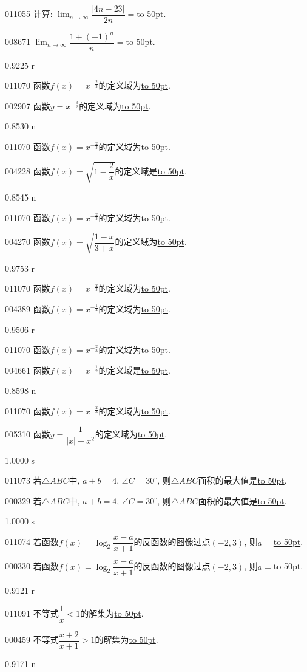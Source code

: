 \documentclass[10pt,a4paper]{article}
\newcommand{\blank}[1]{\underline{\hbox to #1pt{}}}
\begin{document}
011055	计算: $\displaystyle\lim_{n\to \infty} \dfrac{|4n-23|}{2n}=$\blank{50}.

008671	$\displaystyle\lim_{n\to\infty}\dfrac{1+(-1)^n}n=$\blank{50}.

0.9225 r

011070	函数$f(x)=x^{- \frac 23}$的定义域为\blank{50}.

002907	函数$y=x^{-\frac 32}$的定义域为\blank{50}.

0.8530 n

011070	函数$f(x)=x^{- \frac 23}$的定义域为\blank{50}.

004228	函数$f(x)=\sqrt{1-\dfrac 2x}$的定义域是\blank{50}.

0.8545 n

011070	函数$f(x)=x^{- \frac 23}$的定义域为\blank{50}.

004270	函数$f(x)=\sqrt{\dfrac{1-x}{3+x}}$的定义域为\blank{50}.

0.9753 r

011070	函数$f(x)=x^{- \frac 23}$的定义域为\blank{50}.

004389	函数$f(x)=x^{- \frac 12}$的定义域为\blank{50}.

0.9506 r

011070	函数$f(x)=x^{- \frac 23}$的定义域为\blank{50}.

004661	函数$f(x)={x^{-\frac 12}}$的定义域是\blank{50}.

0.8598 n

011070	函数$f(x)=x^{- \frac 23}$的定义域为\blank{50}.

005310	函数$y=\dfrac 1{|x|-x^2}$的定义域为\blank{50}.

1.0000 s

011073	若$\triangle ABC$中, $a+b=4$, $\angle C=30^\circ$, 则$\triangle  ABC$面积的最大值是\blank{50}.

000329	若$\triangle ABC$中, $a+b=4$, $\angle C=30^\circ$, 则$\triangle ABC$面积的最大值是\blank{50}.

1.0000 s

011074	若函数$f(x)=\log_2\dfrac{x-a}{x+1}$的反函数的图像过点$(-2,3)$, 则$a=$\blank{50}.

000330	若函数$f(x)=\log_2\dfrac{x-a}{x+1}$的反函数的图像过点$(-2,3)$, 则$a=$\blank{50}.

0.9121 r

011091	不等式$\dfrac 1x<1$的解集为\blank{50}.

000459	不等式$\dfrac{x+2}{x+1}>1$的解集为\blank{50}.

0.9171 n
\end{document}

